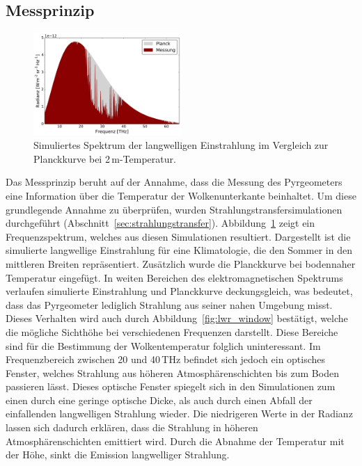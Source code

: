 \documentclass[10pt,a4paper,compsoc,peer review papers]{IEEEtran}
\begin{document}
\subsection{Messprinzip}\label{subsec:clb_prinzip}

\begin{figure}[ht]
  \centering
  \includegraphics[width=0.5\textwidth]{figures/midlatitude-summer_spectrum.pdf}
  \caption{Simuliertes Spektrum der langwelligen Einstrahlung im Vergleich zur
  Planckkurve bei 2\,m-Temperatur.}
  \label{fig:lwr_spectrum}
\end{figure}

Das Messprinzip beruht auf der Annahme, dass die Messung des Pyrgeometers eine
Information über die Temperatur der Wolkenunterkante beinhaltet. Um diese
grundlegende Annahme zu überprüfen, wurden Strahlungstransfersimulationen
durchgeführt (Abschnitt~\ref{sec:strahlungstransfer}).
Abbildung~\ref{fig:lwr_spectrum} zeigt ein Frequenzspektrum, welches aus diesen
Simulationen resultiert. Dargestellt ist die simulierte langwellige
Einstrahlung für eine Klimatologie, die den Sommer in den mittleren Breiten
repräsentiert.  Zusätzlich wurde die Planckkurve bei bodennaher Temperatur
eingefügt. In weiten Bereichen des elektromagnetischen Spektrums verlaufen
simulierte Einstrahlung und Planckkurve deckungsgleich, was bedeutet, dass das
Pyrgeometer lediglich Strahlung aus seiner nahen Umgebung misst. Dieses Verhalten
wird auch durch Abbildung~\ref{fig:lwr_window} bestätigt, welche die mögliche
Sichthöhe bei verschiedenen Frequenzen darstellt. Diese Bereiche sind für die
Bestimmung der Wolkentemperatur folglich uninteressant. Im Frequenzbereich
zwischen 20 und 40\,THz befindet sich jedoch ein optisches Fenster, welches
Strahlung aus höheren Atmosphärenschichten bis zum Boden passieren lässt.
Dieses optische Fenster spiegelt sich in den Simulationen zum einen durch eine
geringe optische Dicke, als auch durch einen Abfall der einfallenden langwelligen
Strahlung wieder. Die niedrigeren Werte in der Radianz lassen sich dadurch
erklären, dass die Strahlung in höheren Atmosphärenschichten emittiert wird.
Durch die Abnahme der Temperatur mit der Höhe, sinkt die Emission langwelliger
Strahlung.
\end{document}
